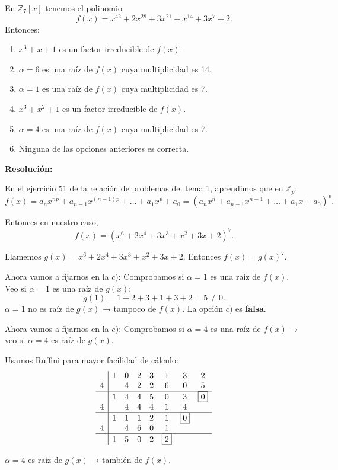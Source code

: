 \documentclass[a4paper,12pt]{article}
\begin{document}
\begin{ejercicioExamen}[title=Ejercicio 5]
En \( \mathbb{Z}_7[x] \) tenemos el polinomio 
\[
f(x) = x^{42} + 2x^{28} + 3x^{21} + x^{14} + 3x^7 + 2.
\]
Entonces:

\begin{enumerate}
\item[$a)$] \( x^3 + x + 1 \) es un factor irreducible de \( f(x) \).
\item[$b)$] \( \alpha = 6 \) es una raíz de \( f(x) \) cuya multiplicidad es 14.
\item[$c)$] \( \alpha = 1 \) es una raíz de \( f(x) \) cuya multiplicidad es 7.
\item[$d)$] \( x^3 + x^2 + 1 \) es un factor irreducible de \( f(x) \).
\item[$e)$] \( \alpha = 4 \) es una raíz de \( f(x) \) cuya multiplicidad es 7.
\item[$f)$] Ninguna de las opciones anteriores es correcta.
\end{enumerate}

\tcblower
\textbf{Resolución:}

En el ejercicio 51 de la relación de problemas del tema 1, aprendimos que en \(\mathbb{Z}_p\):
\[
f(x) = a_n x^{n p} + a_{n-1} x^{(n-1)p} + \dots + a_1 x^p + a_0 = (a_n x^n + a_{n-1} x^{n-1} + \dots + a_1 x + a_0)^p.
\]

Entonces en nuestro caso,
\[
f(x) = (x^6 + 2x^4 + 3x^3 + x^2 + 3x + 2)^7.
\]

Llamemos \( g(x) = x^6 + 2x^4 + 3x^3 + x^2 + 3x + 2 \).  
Entonces \( f(x) = g(x)^7. \)

\medskip
Ahora vamos a fijarnos en la \textbf{$c)$}:  
Comprobamos si \( \alpha = 1 \) es una raíz de \( f(x) \).  
Veo si \( \alpha = 1 \) es una raíz de \( g(x) \):
\[
g(1) = 1 + 2 + 3 + 1 + 3 + 2 = 5 \neq 0.
\]
\(\alpha = 1\) no es raíz de \( g(x) \) → tampoco de \( f(x) \).  
La opción $c)$ es \textbf{falsa}.

\medskip
Ahora vamos a fijarnos en la \textbf{$e)$}:  
Comprobamos si \( \alpha = 4 \) es una raíz de \( f(x) \) → veo si \( \alpha = 4 \) es raíz de \( g(x) \).

Usamos Ruffini para mayor facilidad de cálculo:
\[
\begin{array}{c|ccccccc}
 & 1 & 0 & 2 & 3 & 1 & 3 & 2 \\
4 &   & 4 & 2 & 2 & 6 & 0 & 5 \\
\hline
 & 1 & 4 & 4 & 5 & 0 & 3 & \boxed{0} \\
4 &   & 4 & 4 & 4 & 1 & 4 \\
\hline
 & 1 & 1 & 1 & 2 & 1 & \boxed{0} \\
4 &   & 4 & 6 & 0 & 1 \\
\hline
 & 1 & 5 & 0 & 2 & \boxed{2}
\end{array}
\]

\(\alpha = 4\) es raíz de \( g(x) \) → también de \( f(x) \).

\end{ejercicioExamen}
\end{document}
